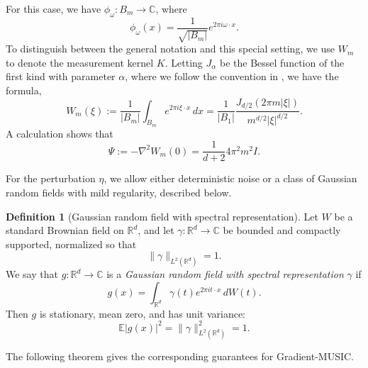 \documentclass[11pt]{article}
\theoremstyle{definition}
\newtheorem{definition}{Definition}[section]
\numberwithin{theorem}{section}
\numberwithin{lemma}{section}
\numberwithin{equation}{section}
\def\C{\mathbb{C}}
\def\E{\mathbb{E}}
\def\R{\mathbb{R}}
\newcommand{\red}{\color{red}}
\numberwithin{equation}{section}
\begin{document}
	For this case, we have $\phi_\omega\colon B_m\to\C$, where  
	$$
	\phi_\omega(x) = \frac 1{\sqrt{|B_m|}}e^{2\pi i \omega\cdot x}.
	$$
	To distinguish between the general notation and this special setting, we use $W_m$ to denote the measurement kernel $K$. Letting $J_\alpha$ be the Bessel function of the first kind with parameter $\alpha$, where we follow the convention in \cite[equation (8), papge 40]{watson1922treatise}, we have the formula,
	\begin{equation}
		\label{eq:Besselkernel}
		W_m(\xi)
		:= \frac{1}{|B_m|} \int_{B_m} e^{2\pi i  \xi \cdot x}\, dx
		= \frac{1}{|B_1|} \frac{ J_{d/2}(2\pi m|\xi|)}{m^{d/2}|\xi|^{d/2} }. 
	\end{equation}
	A calculation shows that
	\begin{equation}
		\label{eq:hessian2}
		\Psi:=-\nabla^2 W_m(0)= \frac {1}{d+2} 4\pi^2 m^2 I.
	\end{equation}



{For the perturbation $\eta$, we allow either deterministic noise or a class of Gaussian random fields with mild regularity, described below.

\begin{definition}[Gaussian random field with spectral representation]
\label{def:etastochastic}
Let $W$ be a standard Brownian field on $\R^d$, and let $\gamma\colon \R^d\to \C$ be bounded and compactly supported, normalized so that
\[
\|\gamma\|_{L^2(\R^d)}=1.
\]
We say that $g\colon \R^d\to \C$ is a \emph{Gaussian random field with spectral representation} $\gamma$ if
\[
g(x)=\int_{\R^d} \gamma(t)e^{2\pi i t\cdot x}\,dW(t).
\]
Then $g$ is stationary, mean zero, and has unit variance:
\[
\E |g(x)|^2=\|\gamma\|_{L^2(\R^d)}^2=1.
\]
\end{definition}
}


The following theorem gives the corresponding guarantees for Gradient-MUSIC. 
\end{document}
